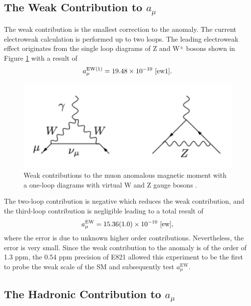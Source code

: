 \documentclass{outhesis}
\begin{document}
\subsection{The Weak Contribution to $a_{\mu}$}

The weak contribution is the smallest correction to the anomaly. The current electroweak calculation is performed up to two loops.
The leading electroweak effect originates from the single loop diagrams of Z and W$^{\pm}$ bosons shown in Figure \ref{fig:weak} with a result of 
\begin{equation}
a_{\mu}^{\text{EW(1)}} = 19.48 \times 10^{-10} \,\,\cite{ew1}.
\end{equation}
\begin{figure}
  \centering
  \includegraphics[scale=0.5]{figures/wz}
   \caption[Feynman diagram of a weak contribution]{Weak contributions to the muon anomalous magnetic moment with a one-loop diagrams with virtual W and Z gauge bosons \cite{thesis}. }
  \label{fig:weak}
\end{figure}
The two-loop contribution is negative which reduces the weak contribution, and the third-loop contribution is negligible leading to a total result of 
\begin{equation}
a_{\mu}^{\text{EW}} = 15.36(1.0) \times 10^{-10} \,\,\cite{ew},
\label{eq:ew}
\end{equation}
where the error is due to unknown higher order contributions. Nevertheless, the error is very small.
Since the weak contribution to the anomaly is of the order of 1.3 ppm, the 0.54 ppm precision of E821 allowed this experiment to be the first to probe the weak scale of the SM and subsequently test $a_{\mu}^{\text{EW}}$. 

\subsection{The Hadronic Contribution to $a_{\mu}$}
\end{document}

